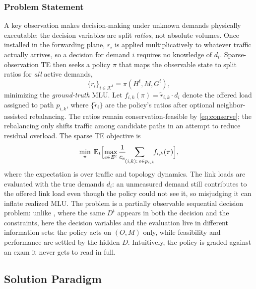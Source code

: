 \subsubsection{Problem Statement}
A key observation makes decision-making under unknown demands physically
executable: the decision variables are split \emph{ratios}, not absolute
volumes. Once installed in the forwarding plane, $r_i$ is applied
multiplicatively to whatever traffic actually arrives, so a decision for
demand $i$ requires no knowledge of $d_i$. Sparse-observation TE then
seeks a policy $\pi$ that maps the observable state to
split ratios for \emph{all} active demands,
\begin{equation}
    \{r_i\}_{i \in \mathcal{K}^t} = \pi\left(H^t, M, G^t\right),
    \label{eq:policy}
\end{equation}
minimizing the \emph{ground-truth} MLU. Let
$f_{i,k}(\pi) = \tilde{r}_{i,k} \cdot d_i$ denote the offered load assigned
to path $p_{i,k}$, where $\{\tilde{r}_i\}$ are the policy's ratios after
optional neighbor-assisted rebalancing. The ratios remain
conservation-feasible by \cref{eq:conserve}; the rebalancing only shifts
traffic among candidate paths in an attempt to reduce residual overload. The sparse TE
objective is
\begin{equation}
    \min_{\pi} \;
    \mathbb{E}_t \Bigl[ \max_{e \in E^t}
        \frac{1}{c_e}\!\!\sum_{(i,k):\, e \in p_{i,k}}\!\! f_{i,k}(\pi)
    \Bigr],
    \label{eq:sparse-mlu}
\end{equation}
where the expectation is over traffic and topology dynamics. The link
loads are evaluated with the true demands $d_i$: an unmeasured demand still
contributes to the offered link load even though the policy could not see
it, so misjudging it can inflate realized MLU. The problem
is a partially observable sequential decision problem: unlike
, where the same $D^t$ appears in both
the decision and the constraints, here the decision variables and the
evaluation live in different information sets: the policy acts on
$(O, M)$ only, while feasibility and performance are settled by the
hidden $D$. Intuitively, the policy is graded against an exam it never
gets to read in full.

\subsection{Solution Paradigm}
\label{sec:paradigm}


